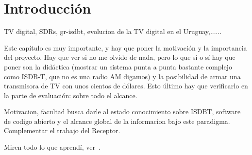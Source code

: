 \chapter{Introducción}

TV digital, SDRs, gr-isdbt, evolucion de la TV digital en el Uruguay,......

Este capítulo es muy importante, y hay que poner la motivación y la importancia del proyecto. Hay que ver si no me olvido de nada, pero lo que sí o sí hay que poner son la didáctica (mostrar un sistema punta a punta bastante complejo como ISDB-T, que no es una radio AM digamos) y la posibilidad de armar una transmisora de TV con unos cientos de dólares. Esto último hay que verificarlo en la parte de evaluación: sobre todo el alcance. 

Motivacion, facultad busca darle al estado conocimiento sobre ISDBT, software de codigo abierto y el alcance global de la informacion bajo este paradigma. Complementar el trabajo del Receptor.

Miren todo lo que aprendí, ver~\cite{Autor}.

